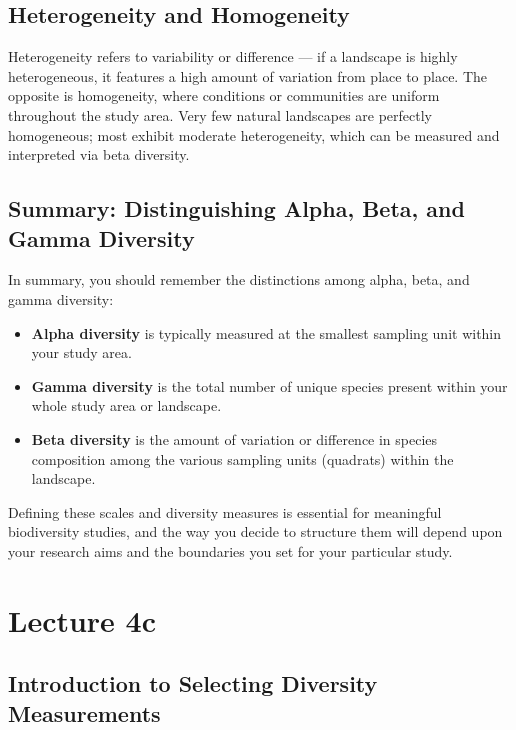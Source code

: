 \documentclass[
  10pt,
]{book}
\providecommand{\tightlist}{%
  \setlength{\itemsep}{0pt}\setlength{\parskip}{0pt}}
\begin{document}
\section{Heterogeneity and
Homogeneity}\label{heterogeneity-and-homogeneity}

Heterogeneity refers to variability or difference --- if a landscape is
highly heterogeneous, it features a high amount of variation from place
to place. The opposite is homogeneity, where conditions or communities
are uniform throughout the study area. Very few natural landscapes are
perfectly homogeneous; most exhibit moderate heterogeneity, which can be
measured and interpreted via beta diversity.

\section{Summary: Distinguishing Alpha, Beta, and Gamma
Diversity}\label{summary-distinguishing-alpha-beta-and-gamma-diversity}

In summary, you should remember the distinctions among alpha, beta, and
gamma diversity:

\begin{itemize}
\tightlist
\item
  \textbf{Alpha diversity} is typically measured at the smallest
  sampling unit within your study area.
\item
  \textbf{Gamma diversity} is the total number of unique species present
  within your whole study area or landscape.
\item
  \textbf{Beta diversity} is the amount of variation or difference in
  species composition among the various sampling units (quadrats) within
  the landscape.
\end{itemize}

Defining these scales and diversity measures is essential for meaningful
biodiversity studies, and the way you decide to structure them will
depend upon your research aims and the boundaries you set for your
particular study.

\chapter*{Lecture 4c}\label{lecture-4c}

\section{Introduction to Selecting Diversity
Measurements}\label{introduction-to-selecting-diversity-measurements}
\end{document}

